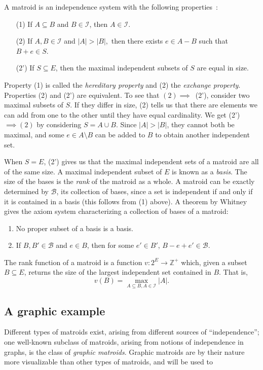 A matroid is an independence system with the following properties~\cite{whitney-1935}:
\begin{enumerate}
  \item[(1)] If $A \subseteq B$ and $B \in \mathcal{I}$, then $A \in \mathcal{I}$.
  \item[(2)] If $A, B \in \mathcal{I}$ and $|A| > |B|,$ then there exists $e \in A - B$ such that $B + e \in S$.
  \item[(2')] If $S \subseteq E$, then the maximal independent subsets of $S$ are equal in size.
\end{enumerate}
Property (1) is called the \textit{hereditary property} and (2) the \textit{exchange property}. Properties (2) and (2') are equivalent. To see that $(2) \implies$~(2'), consider two maximal subsets of $S$. If they differ in size, (2) tells us that there are elements we can add from one to the other until they have equal cardinality. We get (2')~$\implies (2)$ by considering $S = A \cup B$. Since $|A|>|B|$, they cannot both be maximal, and some $e \in A \setminus B$ can be added to $B$ to obtain another independent set. 

When $S=E$, (2') gives us that the maximal independent sets of a matroid are all of the same size. A maximal independent subset of $E$ is known as a \textit{basis}. The size of the bases is the \textit{rank} of the matroid as a whole.  A matroid can be exactly determined by $\mathcal{B}$, its collection of bases, since a set is independent if and only if it is contained in a basis (this follows from (1) above). A theorem by Whitney~\cite{whitney-1935} gives the axiom system characterizing a collection of bases of a matroid: 
\begin{enumerate}
  \item No proper subset of a basis is a basis.
  \item If $B, B'\in \mathcal{B}$ and $e \in B$, then for some $e'\in B'$, $B-e+e'\in\mathcal{B}$.
\end{enumerate} 

The rank function of a matroid is a function $v:2^E \to \mathbb{Z}^+$ which, given a subset $B\subseteq E$, returns the size of the largest independent set contained in $B$. That is, $$v(B) = \max_{A \subseteq B, A\in \mathcal{I}}|A|.$$

\subsection{A graphic example}
Different types of matroids exist, arising from different sources of ``independence''; one well-known subclass of matroids, arising from notions of independence in graphs, is the class of \textit{graphic matroids}. Graphic matroids are by their nature more visualizable than other types of matroids, and will be used to 


